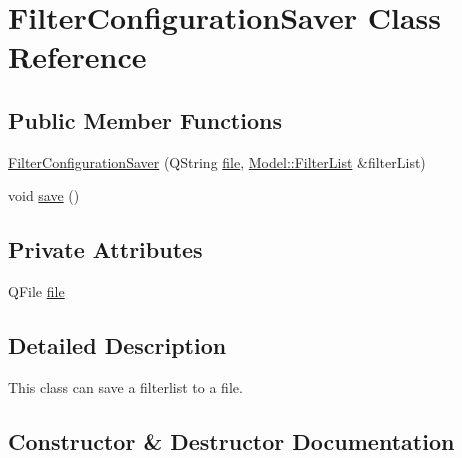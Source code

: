 \hypertarget{classUtility_1_1FilterConfigurationSaver}{}\section{Filter\+Configuration\+Saver Class Reference}
\label{classUtility_1_1FilterConfigurationSaver}
\subsection*{Public Member Functions}
\begin{DoxyCompactItemize}
\item 
\hyperlink{classUtility_1_1FilterConfigurationSaver_a775cdbd27b96b192f171584ac40d900c}{Filter\+Configuration\+Saver} (Q\+String \hyperlink{classUtility_1_1FilterConfigurationSaver_a74a949f8555712ca2e528cf69d0d7f68}{file}, \hyperlink{classModel_1_1FilterList}{Model\+::\+Filter\+List} \&filter\+List)
\item 
void \hyperlink{classUtility_1_1FilterConfigurationSaver_aae2c382151ef7c9aa913361172b30db6}{save} ()
\end{DoxyCompactItemize}
\subsection*{Private Attributes}
\begin{DoxyCompactItemize}
\item 
Q\+File \hyperlink{classUtility_1_1FilterConfigurationSaver_a74a949f8555712ca2e528cf69d0d7f68}{file}
\end{DoxyCompactItemize}


\subsection{Detailed Description}
This class can save a filterlist to a file. 

\subsection{Constructor \& Destructor Documentation}
\hypertarget{classUtility_1_1FilterConfigurationSaver_a775cdbd27b96b192f171584ac40d900c}{}
